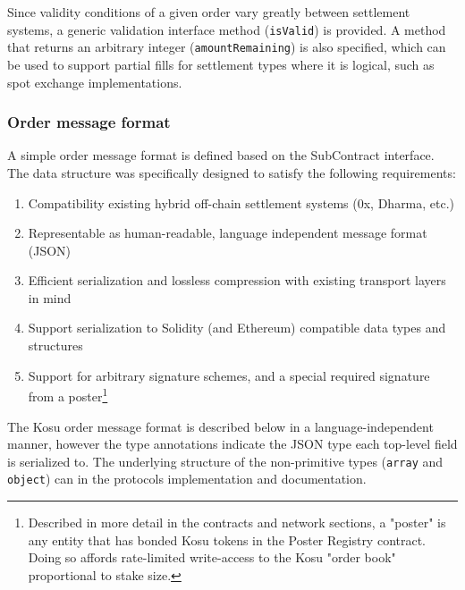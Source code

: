 \documentclass[10pt]{article}
\begin{document}
Since validity conditions of a given order vary greatly between settlement systems, a generic validation interface method (\texttt{isValid}) is provided. A method that returns an arbitrary integer (\texttt{amountRemaining}) is also specified, which can be used to support partial fills for settlement types where it is logical, such as spot exchange implementations.

\subsubsection{Order message format}\label{order-message-format}

A simple order message format is defined based on the SubContract interface. The data structure was specifically designed to satisfy the following requirements:

\begin{enumerate}
  \item Compatibility existing hybrid off-chain settlement systems (0x\cite{0x-wp}, Dharma\cite{dharma-wp}, etc.)
  \item Representable as human-readable, language independent message format (JSON)
  \item Efficient serialization and lossless compression with existing transport layers in mind
  \item Support serialization to Solidity (and Ethereum) compatible data types and structures
  \item Support for arbitrary signature schemes, and a special required signature from a poster\footnote{Described in more detail in the contracts and network sections, a "poster" is any entity that has bonded Kosu tokens in the Poster Registry contract. Doing so affords rate-limited write-access to the Kosu "order book" proportional to stake size.}
\end{enumerate}

The Kosu order message format is described below in a language-independent manner, however the type annotations indicate the JSON type each top-level field is serialized to. The underlying structure of the non-primitive types (\texttt{array} and \texttt{object}) can in the protocols implementation\cite{kosu-monorepo} and documentation.
\end{document}
